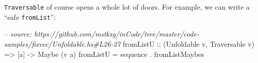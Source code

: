 \documentclass[]{article}
\newenvironment{Shaded}{}{}
\newcommand{\DataTypeTok}[1]{\textcolor[rgb]{0.56,0.13,0.00}{#1}}
\newcommand{\DecValTok}[1]{\textcolor[rgb]{0.25,0.63,0.44}{#1}}
\newcommand{\StringTok}[1]{\textcolor[rgb]{0.25,0.44,0.63}{#1}}
\newcommand{\CommentTok}[1]{\textcolor[rgb]{0.38,0.63,0.69}{\textit{#1}}}
\newcommand{\OtherTok}[1]{\textcolor[rgb]{0.00,0.44,0.13}{#1}}
\newcommand{\FunctionTok}[1]{\textcolor[rgb]{0.02,0.16,0.49}{#1}}
\newcommand{\NormalTok}[1]{#1}
\begin{document}
\begin{Shaded}
\end{Shaded}

\texttt{Traversable} of course opens a whole lot of doors. For example, we can
write a ``safe \texttt{fromList}'':

\begin{Shaded}
\begin{Highlighting}[]
\CommentTok{-- source: https://github.com/mstksg/inCode/tree/master/code-samples/fixvec/Unfoldable.hs#L26-27}
\OtherTok{fromListU ::}\NormalTok{ (}\DataTypeTok{Unfoldable}\NormalTok{ v, }\DataTypeTok{Traversable}\NormalTok{ v) }\OtherTok{=>}\NormalTok{ [a] }\OtherTok{->} \DataTypeTok{Maybe}\NormalTok{ (v a)}
\NormalTok{fromListU }\FunctionTok{=}\NormalTok{ sequence }\FunctionTok{.}\NormalTok{ fromListMaybes}
\end{Highlighting}
\end{Shaded}
\end{document}
